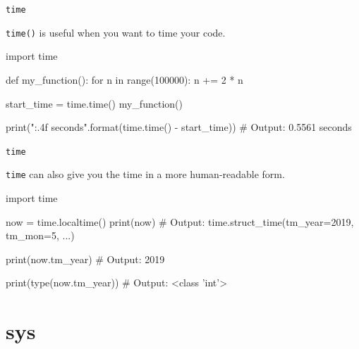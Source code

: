 \begin{frame}[fragile]{\texttt{time}}

    \texttt{time()} is useful when you want to time your code.

    \begin{pythoncode}

import time

def my_function():
    for n in range(100000):
        n += 2 * n

start_time = time.time()
my_function()

print("{:.4f} seconds".format(time.time() - start_time))
# Output: 0.5561 seconds

    \end{pythoncode}


\end{frame}


\begin{frame}[fragile]{\texttt{time}}

    \texttt{time} can also give you the time in a more human-readable form.

    \begin{pythoncode}

import time

now = time.localtime()
print(now)
# Output: time.struct_time(tm_year=2019, tm_mon=5, ...)

print(now.tm_year)
# Output: 2019

print(type(now.tm_year))
# Output: <class 'int'>

    \end{pythoncode}


\end{frame}


\section{sys}

